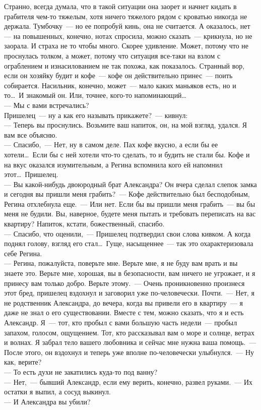 Странно, всегда думала, что в такой ситуации она заорет и начнет кидать в 
грабителя чем-то тяжелым, хотя ничего тяжелого рядом с кроватью никогда не 
держала. Тумбочку~--- но ее попробуй кинь, она не считается. А оказалось, нет 
--- на 
повышенных, конечно, нотах спросила, можно сказать~--- крикнула, но не заорала. 
И 
страха не то чтобы много. Скорее удивление. Может, потому что не проснулась 
толком, а может, потому что ситуация все-таки на взлом с ограблением и 
изнасилованием не так похожа, как показалось. Странный вор, если он хозяйку 
будит и кофе~--- кофе он действительно принес~--- поить собирается. Насильник, 
конечно, может~--- мало каких маньяков есть, но и то\ldots\ И знакомый он. Или, 
точнее, кого-то напоминающий\ldots\\
--- Мы с вами встречались?\\
Пришелец~--- ну а как его называть прикажете?~--- кивнул:\\
--- Теперь вы проснулись. Возьмите ваш напиток, он, на мой взгляд, удался. Я 
вам 
все объясню.\\
--- Спасибо,~--- Нет, ну в самом деле. Пах кофе вкусно, а если бы ее 
хотели\ldots\ Если 
бы с ней хотели что-то сделать, то и будить не стали бы. Кофе и на вкус 
оказался 
изумительным, а Регина вспомнила кого ей напомнил этот\ldots\ Пришелец.\\
--- Вы какой-нибудь двоюродный брат Александра? Он вчера сделал слепок замка и 
сегодня вы пришли меня грабить?~--- Кофе действительно был бесподобным, Регина 
отхлебнула еще.~--- Или нет. Если бы вы пришли меня грабить~--- вы бы меня не 
будили. Вы, наверное, будете меня пытать и требовать переписать на вас 
квартиру? 
Напиток, кстати, божественный, спасибо.\\
--- Спасибо, что оценили,~--- Пришелец подтвердил свои слова кивком. А когда 
поднял 
голову, взгляд его стал\ldots\ Гуще, насыщеннее~--- так это охарактеризовала 
себе 
Регина.\\
--- Регина, пожалуйста, поверьте мне. Верьте мне, я не буду вам врать и вы 
знаете 
это. Верьте мне, хорошая, вы в безопасности, вам ничего не угрожает, и я 
принесу 
вам только добро. Верьте этому.~--- Очень проникновенно произнеся этот бред, 
пришелец вздохнул и заговорил уже по-человечески. Почти.~--- Нет, я не 
родственник 
Александра, до вечера, когда вы привели его в квартиру~--- я даже не знал о его 
существовании. Вместе с тем, можно сказать, что я и есть Александр. Я~--- тот, 
кто 
пробыл с вами большую часть недели~--- пробыл запахом, голосом, ощущением. Тот, 
кто рассказывал вам о море и солнце, ветрах и волнах. Я забрал тело вашего 
любовника и сейчас мне нужна ваша помощь.~--- После этого, он вздохнул и теперь 
уже вполне по-человечески улыбнулся.~--- Ну как, верите?\\
--- То есть духи не закатились куда-то под ванну?\\
--- Нет,~--- бывший Александр, если ему верить, конечно, развел руками.~--- Их 
остатки 
я выпил, а сосуд выкинул.\\
--- И Александра вы убили?\\

